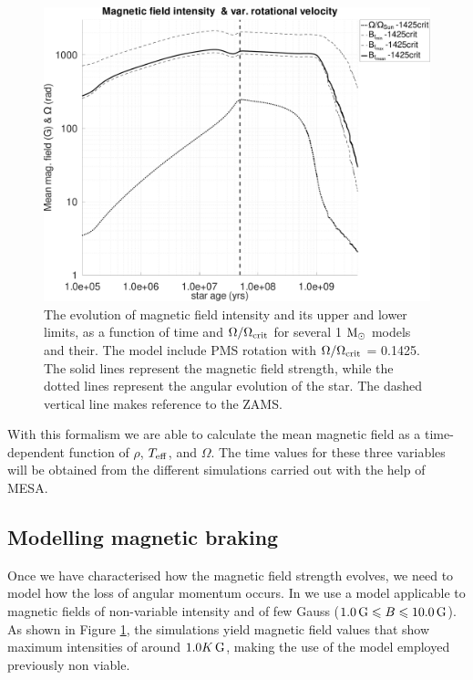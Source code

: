 \documentclass[fleqn,usenatbib]{mnras}
\begin{document}
\begin{ceqn}
\begin{figure}
	\includegraphics[clip,width=\columnwidth]{figures/paper2/mag_field_limits_var_vel_g3.pdf}
    \caption{The evolution of magnetic field intensity and its upper and lower limits, as a function of time and $\Omega / \Omega_{\mathrm{crit}}$ for several 1 $\mathrm{M}_\odot$ models and their. The model include PMS rotation with $\Omega / \Omega_{\mathrm{crit}}$ = 0.1425. The solid lines represent the magnetic field strength, while the dotted lines represent the angular evolution of the star. The dashed vertical line makes reference to the ZAMS.}
    \label{fig:mag_field_limits_var_vel_g3}
\end{figure}

With this formalism we are able to calculate the mean magnetic field as a time-dependent function of $\rho$, $T_{\mathrm{eff}}$, and $\Omega$. The time values for these three variables will be obtained from the different simulations carried out with the help of MESA.

\subsection{Modelling magnetic braking} \label{mod_mb}
Once we have characterised how the magnetic field strength evolves, we need to model how the loss of angular momentum occurs.  In \cite{Navarro2020} we use a model applicable to magnetic fields of non-variable intensity and of few Gauss ($1.0\,\mathrm{G} \leqslant B \leqslant 10.0\,\mathrm{G}$). As shown in Figure \ref{fig:mag_field_limits_var_vel_g3}, the simulations yield magnetic field values that show maximum intensities of around $1.0K\,\mathrm{G}$, making the use of the model employed previously non viable.


\end{ceqn}
\end{document}
